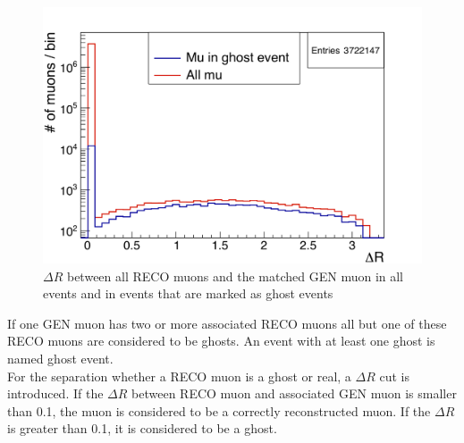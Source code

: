 \begin{figure}[htbp]
\centering
\begin{minipage}[t]{0.95\textwidth}
\includegraphics[width=\textwidth]{Figures/scheuch/Trennung.png}
\caption{$\Delta R$ between all RECO muons and the matched GEN muon in all events and in events that are marked as ghost events}
\label{DeltaRDistribution}
\end{minipage}
\end{figure}
If one GEN muon has two or more associated RECO muons all but one of these RECO muons are considered to be ghosts. An event with at least one ghost is named ghost event.\\
For the separation whether a RECO muon is a ghost or real, a $\Delta R$ cut is introduced. If the $\Delta R$ between RECO muon and associated GEN muon is smaller than 0.1, the muon is considered to be a correctly reconstructed muon. If the $\Delta R$ is greater than 0.1, it is considered to be a ghost.

